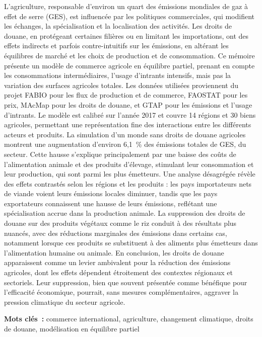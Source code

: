 L’agriculture, responsable d’environ un quart des émissions mondiales de gaz à effet de serre (GES), est influencée par les politiques commerciales, qui modifient les échanges, la spécialisation et la localisation des activités. Les droits de douane, en protégeant certaines filières ou en limitant les importations, ont des effets indirects et parfois contre-intuitifs sur les émissions, en altérant les équilibres de marché et les choix de production et de consommation. Ce mémoire présente un modèle de commerce agricole en équilibre partiel, prenant en compte les consommations intermédiaires, l'usage d'intrants intensifs, mais pas la variation des surfaces agricoles totales. Les données utilisées proviennent du projet FABIO pour les flux de production et de commerce, FAOSTAT pour les prix, MAcMap pour les droits de douane, et GTAP pour les émissions et l’usage d’intrants. Le modèle est calibré sur l’année 2017 et couvre 14 régions et 30 biens agricoles, permettant une représentation fine des interactions entre les différents acteurs et produits. La simulation d'un monde sans droits de douane agricoles montrent une augmentation d’environ 6,1~\% des émissions totales de GES, du secteur. Cette hausse s’explique principalement par une baisse des coûts de l’alimentation animale et des produits d’élevage, stimulant leur consommation et leur production, qui sont parmi les plus émetteurs. Une analyse désagrégée révèle des effets contrastés selon les régions et les produits : les pays importateurs nets de viande voient leurs émissions locales diminuer, tandis que les pays exportateurs connaissent une hausse de leurs émissions, reflétant une spécialisation accrue dans la production animale. La suppression des droits de douane sur des produits végétaux comme le riz conduit à des résultats plus nuancés, avec des réductions marginales des émissions dans certains cas, notamment lorsque ces produits se substituent à des aliments plus émetteurs dans l’alimentation humaine ou animale. En conclusion, les droits de douane apparaissent comme un levier ambivalent pour la réduction des émissions agricoles, dont les effets dépendent étroitement des contextes régionaux et sectoriels. Leur suppression, bien que souvent présentée comme bénéfique pour l’efficacité économique, pourrait, sans mesures complémentaires, aggraver la pression climatique du secteur agricole.

\textbf{Mots clés~:} commerce international, agriculture, changement climatique, droits de douane, modélisation en équilibre partiel
